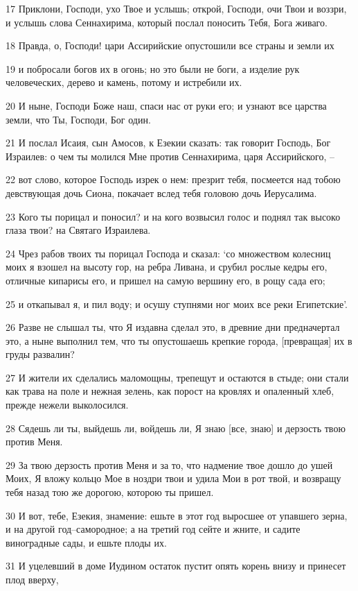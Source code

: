 \par 17 Приклони, Господи, ухо Твое и услышь; открой, Господи, очи Твои и воззри, и услышь слова Сеннахирима, который послал поносить Тебя, Бога живаго.
\par 18 Правда, о, Господи! цари Ассирийские опустошили все страны и земли их
\par 19 и побросали богов их в огонь; но это были не боги, а изделие рук человеческих, дерево и камень, потому и истребили их.
\par 20 И ныне, Господи Боже наш, спаси нас от руки его; и узнают все царства земли, что Ты, Господи, Бог один.
\par 21 И послал Исаия, сын Амосов, к Езекии сказать: так говорит Господь, Бог Израилев: о чем ты молился Мне против Сеннахирима, царя Ассирийского, --
\par 22 вот слово, которое Господь изрек о нем: презрит тебя, посмеется над тобою девствующая дочь Сиона, покачает вслед тебя головою дочь Иерусалима.
\par 23 Кого ты порицал и поносил? и на кого возвысил голос и поднял так высоко глаза твои? на Святаго Израилева.
\par 24 Чрез рабов твоих ты порицал Господа и сказал: `со множеством колесниц моих я взошел на высоту гор, на ребра Ливана, и срубил рослые кедры его, отличные кипарисы его, и пришел на самую вершину его, в рощу сада его;
\par 25 и откапывал я, и пил воду; и осушу ступнями ног моих все реки Египетские'.
\par 26 Разве не слышал ты, что Я издавна сделал это, в древние дни предначертал это, а ныне выполнил тем, что ты опустошаешь крепкие города, [превращая] их в груды развалин?
\par 27 И жители их сделались маломощны, трепещут и остаются в стыде; они стали как трава на поле и нежная зелень, как порост на кровлях и опаленный хлеб, прежде нежели выколосился.
\par 28 Сядешь ли ты, выйдешь ли, войдешь ли, Я знаю [все, знаю] и дерзость твою против Меня.
\par 29 За твою дерзость против Меня и за то, что надмение твое дошло до ушей Моих, Я вложу кольцо Мое в ноздри твои и удила Мои в рот твой, и возвращу тебя назад тою же дорогою, которою ты пришел.
\par 30 И вот, тебе, Езекия, знамение: ешьте в этот год выросшее от упавшего зерна, и на другой год--самородное; а на третий год сейте и жните, и садите виноградные сады, и ешьте плоды их.
\par 31 И уцелевший в доме Иудином остаток пустит опять корень внизу и принесет плод вверху,
